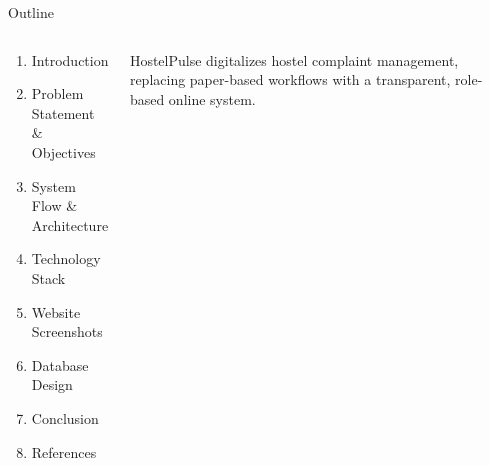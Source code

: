 \documentclass[aspectratio=169]{beamer}
\begin{document}
\begin{frame}[plain]
  \titlepage
\end{frame}

\begin{frame}{Outline}{}
  \begin{columns}[t]
    \begin{tcolorbox}[infobox, title={\color{white}\small\bfseries\faListAlt\quad Contents},
        colbacktitle=TealPrimary]
      \begin{enumerate}\setlength\itemsep{0.3em}
        \item Introduction
        \item Problem Statement \& Objectives
        \item System Flow \& Architecture
        \item Technology Stack
        \item Website Screenshots
        \item Database Design
        \item Conclusion
        \item References
      \end{enumerate}
    \end{tcolorbox}

    \vspace{0.2cm}
    \begin{tcolorbox}[accentbox]
      {\color{TealPrimary}\faInfoCircle}\quad
      {\small HostelPulse digitalizes hostel complaint management,
      replacing paper-based workflows with a transparent,
      role-based online system.}
    \end{tcolorbox}
    \vspace{0.25cm}
    \begin{tcolorbox}[featurebox]
      {\color{NavyBlue}\small\faUserGraduate}\\[4pt]
      {\color{NavyBlue}\small\faUserShield}\\[4pt]
      {\color{NavyBlue}\small\faCloud}\\[4pt]
      {\color{NavyBlue}\small\faDatabase}
    \end{tcolorbox}
  \end{columns}
\end{frame}
\end{document}
